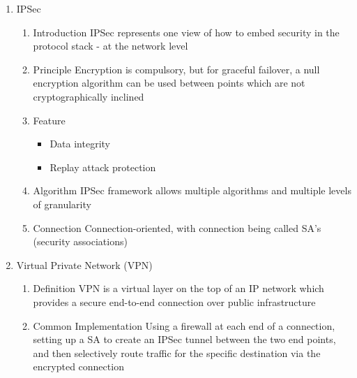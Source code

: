 \documentclass[a4paper,10pt]{article}
\begin{document}
\begin{enumerate}
\begin{enumerate}
      \item IPSec
        \begin{enumerate}
          \item Introduction
            \newline IPSec represents one view of how to embed security in the protocol stack - at the network level
          \item Principle
            \newline Encryption is compulsory, but for graceful failover, a null encryption algorithm can be used between points which are not cryptographically inclined
          \item Feature
            \begin{itemize}
              \item Data integrity
              \item Replay attack protection
            \end{itemize}
          \item Algorithm
            \newline IPSec framework allows multiple algorithms and multiple levels of granularity
          \item Connection
            \newline Connection-oriented, with connection being called SA's (security associations)
        \end{enumerate}
        
      \item Virtual Private Network (VPN)
        \begin{enumerate}
          \item Definition
            \newline VPN is a virtual layer on the top of an IP network which provides a secure end-to-end connection over public infrastructure
          \item Common Implementation
            \newline Using a firewall at each end of a connection, setting up a SA to create an IPSec tunnel between the two end points, and then selectively route traffic for the specific destination via the encrypted connection
        \end{enumerate}
        

\end{enumerate}
\end{enumerate}
\end{document}
